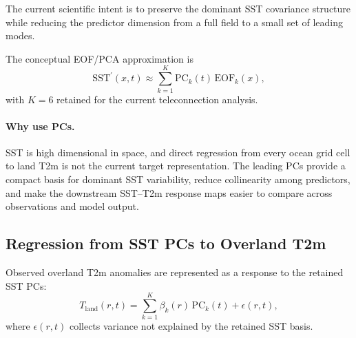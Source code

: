 \documentclass[11pt]{article}
\newcommand{\sst}{\mathrm{SST}}
\newcommand{\tobs}{T_{\mathrm{land}}}
\newcommand{\pc}[1]{\mathrm{PC}_{#1}}
\newcommand{\eof}[1]{\mathrm{EOF}_{#1}}
\begin{document}
The current scientific intent is to preserve the dominant SST covariance structure while reducing the
predictor dimension from a full field to a small set of leading modes.

The conceptual EOF/PCA approximation is
\begin{equation}
\sst^{\prime}(x,t) \approx \sum_{k=1}^{K} \pc{k}(t)\,\eof{k}(x),
\label{eq:eof_expansion}
\end{equation}
with $K=6$ retained for the current teleconnection analysis.

\paragraph{Why use PCs.}
SST is high dimensional in space, and direct regression from every ocean grid cell to land T2m is
not the current target representation. The leading PCs provide a compact basis for dominant SST
variability, reduce collinearity among predictors, and make the downstream SST--T2m response maps
easier to compare across observations and model output.


\subsection{Regression from SST PCs to Overland T2m}
\label{subsec:obs_regression}

Observed overland T2m anomalies are represented as a response to the retained SST PCs:
\begin{equation}
\tobs(r,t) = \sum_{k=1}^{K} \beta_k(r)\,\pc{k}(t) + \epsilon(r,t),
\label{eq:obs_regression}
\end{equation}
where $\epsilon(r,t)$ collects variance not explained by the retained SST basis.
\end{document}
